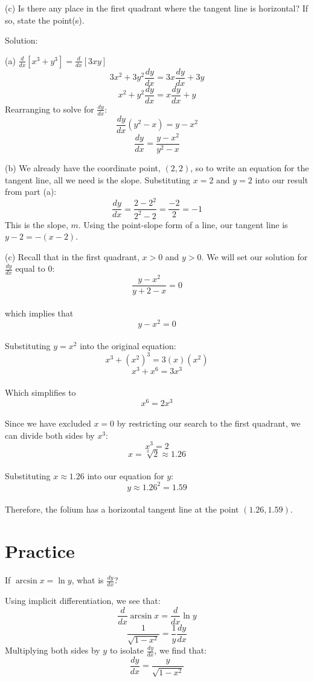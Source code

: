 (c) Is there any place in the first quadrant where the tangent line 
is horizontal? If so, state the point(s). 

Solution:

(a) $\frac{d}{dx}[x^3+y^3]=\frac{d}{dx}[3xy]$
$$3x^2+3y^2\frac{dy}{dx}=3x\frac{dy}{dx}+3y$$
$$x^2+y^2\frac{dy}{dx}=x\frac{dy}{dx}+y$$
Rearranging to solve for $\frac{dy}{dx}$:
$$\frac{dy}{dx}(y^2-x)=y-x^2$$
$$\frac{dy}{dx}=\frac{y-x^2}{y^2-x}$$

(b) We already have the coordinate point, $(2, 2)$, so to write an 
equation for the tangent line, all we need is the slope. Substituting 
$x=2 \text{ and }y=2$ into our result from part (a):
$$\frac{dy}{dx}=\frac{2-2^2}{2^2-2}=\frac{-2}{2}=-1$$
This is the slope, $m$. Using the point-slope form of a line, our 
tangent line is $y-2=-(x-2)$. 

(c) Recall that in the first quadrant, $x > 0$ and $y > 0$. We will 
set our solution for $\frac{dy}{dx}$  equal to 0:
$$\frac{y-x^2}{y+2-x} = 0$$ \\
which implies that $$y - x^2 = 0$$ \\
Substituting $y = x^2$ into the original equation: 
$$x^3 + (x^2)^3 = 3(x)(x^2)$$ 
$$x^3 + x^6 = 3x^3$$ \\
Which simplifies to 
$$x^6 = 2x^3$$\\
Since we have excluded $x = 0$ by restricting our search to the first 
quadrant, we can divide both sides by $x^3$: 
$$x^3 = 2$$ 
$$x = \sqrt[3]{2} \approx 1.26$$\\
Substituting $x \approx 1.26$ into our equation for $y$: 
$$y \approx 1.26^2 = 1.59$$\\ 
Therefore, the folium has a horizontal tangent line at the point 
$(1.26, 1.59)$.

\section{Practice}
\begin{Exercise} If 
	$\arcsin{x} = \ln{y}$, what is $\frac{dy}{dx}$?
\end{Exercise}

\begin{Answer}[ref=implicit1]
	Using implicit differentiation, we see that:
	$$\frac{d}{dx}\arcsin{x} = \frac{d}{dx}\ln{y}$$
	$$\frac{1}{\sqrt{1-x^2}} = \frac{1}{y}\frac{dy}{dx}$$
	Multiplying both sides by $y$ to isolate $\frac{dy}{dx}$, we find that:
	$$\frac{dy}{dx} = \frac{y}{\sqrt{1-x^2}}$$
\end{Answer}

